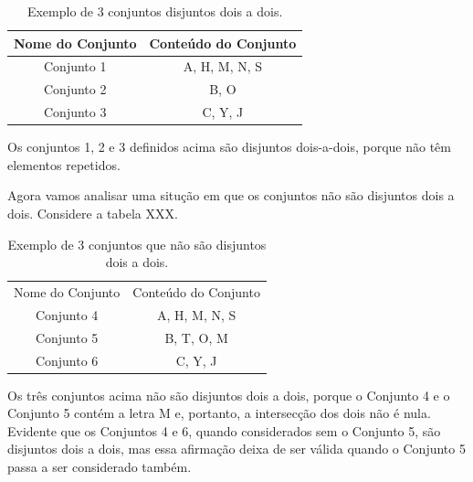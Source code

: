 \documentclass[
12pt,		%
openright,	%
twoside,  %
a4paper,			%
chapter=TITLE,		%
english,			%
french,				%
spanish,			%
brazil				%
]{USPSC-classe/USPSC}
\begin{document}
\begin{table}[htb]
\tiny
\caption{\label{44490fe2b906078abd65fafd043ad29728406f42}Exemplo de 3 conjuntos disjuntos dois a dois.}

\centering
\begin{tabular}{|c|c|}
\hline
Nome do Conjunto  &  Conte\'udo do Conjunto \\
\hline
Conjunto 1  &  A, H, M, N, S \\
Conjunto 2  &  B, O \\
Conjunto 3  &  C, Y, J \\
\hline
\end{tabular}
\end{table}


Os conjuntos 1, 2 e 3 definidos acima s\~ao \textquotedbl disjuntos dois-a-dois\textquotedbl , porque n\~ao t\^em elementos repetidos.









Agora vamos analisar uma situ\c{c}\~ao em que os conjuntos n\~ao s\~ao disjuntos dois a dois. Considere a tabela XXX.













\begin{table}[htb]
\tiny
\caption{\label{9ff362cd60f20203c10ee684d58cf4dec084efbb}Exemplo de 3 conjuntos que n\~ao s\~ao disjuntos dois a dois.}

\centering
\begin{tabular}{|c|c|}
\hline
Nome do Conjunto  &  Conte\'udo do Conjunto \\
Conjunto 4  &  A, H, M, N, S \\
Conjunto 5  &  B, T, O, M \\
Conjunto 6  &  C, Y, J \\
\hline
\end{tabular}
\end{table}


Os tr\^es conjuntos acima n\~ao s\~ao disjuntos dois a dois, porque o Conjunto 4 e o Conjunto 5 cont\'em a letra M e, portanto, a intersec\c{c}\~ao dos dois n\~ao \'e nula. Evidente que os Conjuntos 4 e 6, quando considerados sem o Conjunto 5, s\~ao \textquotedbl disjuntos dois a dois\textquotedbl , mas essa afirma\c{c}\~ao deixa de ser v\'alida quando o Conjunto 5 passa a ser considerado tamb\'em.
\end{document}
